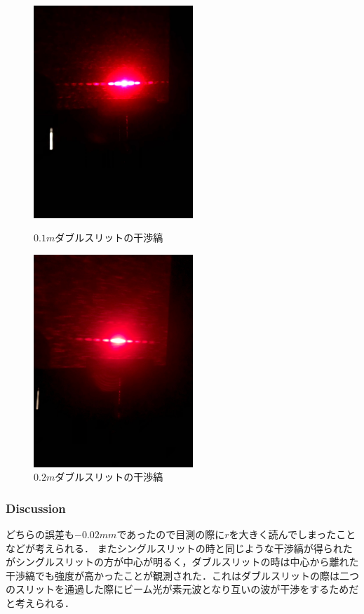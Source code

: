 \documentclass[11pt, a4paper]{jsarticle}
\begin{document}
\begin{figure}[htbp]
 \begin{minipage}{0.45\hsize}
  \begin{center}
   \includegraphics[width=60mm]{fig12.png}
  \end{center}
  \caption{$0.1m$ダブルスリットの干渉縞}
  \label{fig:12}
 \end{minipage}
 \begin{minipage}{0.45\hsize}
  \begin{center}
   \includegraphics[width=60mm]{fig13.png}
  \end{center}
  \caption{$0.2m$ダブルスリットの干渉縞}
  \label{fig:13}
 \end{minipage}
\end{figure}

\subsubsection{Discussion}
どちらの誤差も$-0.02mm$であったので目測の際に$r$を大きく読んでしまったことなどが考えられる．
またシングルスリットの時と同じような干渉縞が得られたがシングルスリットの方が中心が明るく，ダブルスリットの時は中心から離れた干渉縞でも強度が高かったことが観測された．これはダブルスリットの際は二つのスリットを通過した際にビーム光が素元波となり互いの波が干渉をするためだと考えられる．

\newpage
\end{document}

